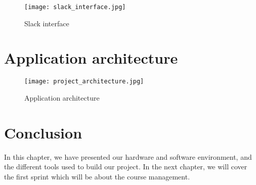 \begin{figure}[!ht]
    \centering
    \texttt{[image: slack\_interface.jpg]}
    \caption{Slack interface}
    \label{fig:slack_interface}
\end{figure}


\section{Application architecture}

\vfill
\clearpage

\begin{figure}[!ht]
    \centering
    \texttt{[image: project\_architecture.jpg]}
    \caption{Application architecture}
    \label{fig:slack_interface}
\end{figure}



\section*{Conclusion}
In this chapter, we have presented our hardware and software environment, and the different tools used to build our project. In the next chapter, we will cover the first sprint which will be about the course management.
